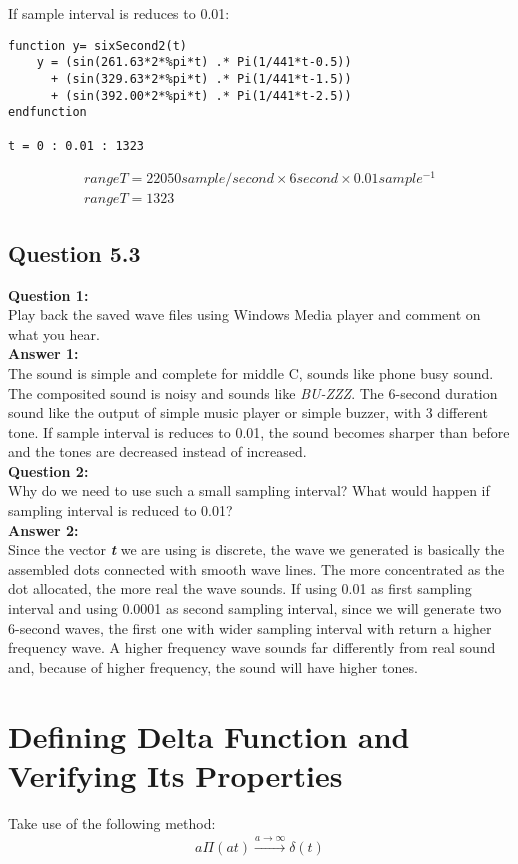 \documentclass[12pt,fleqn]{article}
\begin{document}
If sample interval is reduces to 0.01: \\
\begin{lstlisting}[frame=single]
function y= sixSecond2(t)
    y = (sin(261.63*2*%pi*t) .* Pi(1/441*t-0.5))
      + (sin(329.63*2*%pi*t) .* Pi(1/441*t-1.5))
      + (sin(392.00*2*%pi*t) .* Pi(1/441*t-2.5))
endfunction

t = 0 : 0.01 : 1323
\end{lstlisting}
\begin{gather}
rangeT = 22050 sample/second \times{} 6 second \times{} 0.01 sample^{-1}\\
rangeT = 1323
\end{gather}

\subsection{Question 5.3}
\textbf{Question 1:}\\
Play back the saved wave files using Windows Media player and comment on what you hear.\\
\textbf{Answer 1:}\\
The sound is simple and complete for middle C, sounds like phone busy sound. The composited sound is noisy and sounds like \emph{BU-ZZZ}. The 6-second duration sound like the output of simple music player or simple buzzer, with 3 different tone. If sample interval is reduces to 0.01, the sound becomes sharper than before and the tones are decreased instead of increased.\\
\textbf{Question 2:}\\
Why do we need to use such a small sampling interval? What would happen if sampling interval is reduced to 0.01?\\
\textbf{Answer 2:}\\
Since the vector \emph{\textbf{t}} we are using is discrete, the wave we generated is basically the assembled dots connected with smooth wave lines. The more concentrated as the dot allocated, the more real the wave sounds. If using 0.01 as first sampling interval and using 0.0001 as second sampling interval, since we will generate two 6-second waves, the first one with wider sampling interval with return a higher frequency wave. A higher frequency wave sounds far differently from real sound and, because of higher frequency, the sound will have higher tones.

\section{Defining Delta Function and Verifying Its Properties}
Take use of the following method:\\ 
\begin{gather}
a\Pi{}(at) \xrightarrow{\scriptscriptstyle a\to\infty} \delta{}(t)
\end{gather}
\end{document}
